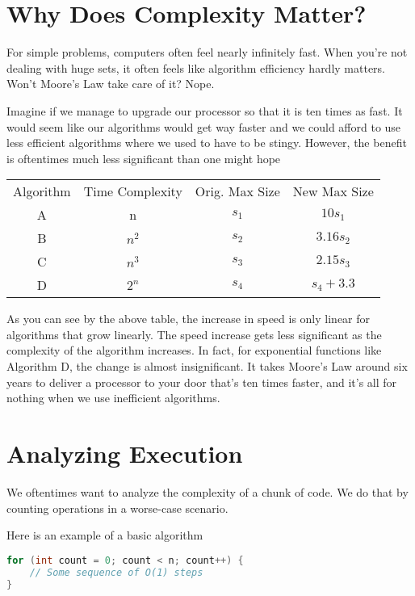 \documentclass{article}
\begin{document}
\section{Why Does Complexity Matter?}
For simple problems, computers often feel nearly infinitely fast. When you're
not dealing with huge sets, it often feels like algorithm efficiency hardly
matters. Won't Moore's Law take care of it? Nope.

Imagine if we manage to upgrade our processor so that it is ten times as fast.
It would seem like our algorithms would get way faster and we could afford to
use less efficient algorithms where we used to have to be stingy. However,
the benefit is oftentimes much less significant than one might hope

\begin{table}[H]
	\centering
	\begin{tabular}{c c c c}
		Algorithm & Time Complexity & Orig. Max Size & New Max Size \\
		A & n     & $s_1$ & $10 s_1$    \\
		B & $n^2$ & $s_2$ & $3.16 s_2$  \\
		C & $n^3$ & $s_3$ & $2.15 s_3$  \\
		D & $2^n$ & $s_4$ & $s_4 + 3.3$ \\
	\end{tabular}
\end{table}

As you can see by the above table, the increase in speed is only linear for
algorithms that grow linearly. The speed increase gets less significant as the
complexity of the algorithm increases. In fact, for exponential functions like
Algorithm D, the change is almost insignificant. It takes Moore's Law around
six years to deliver a processor to your door that's ten times faster, and it's
all for nothing when we use inefficient algorithms.

\section{Analyzing Execution}
We oftentimes want to analyze the complexity of a chunk of code. We do that by
counting operations in a worse-case scenario.

Here is an example of a basic algorithm

\begin{lstlisting}[language=Java]
for (int count = 0; count < n; count++) {
	// Some sequence of O(1) steps
}
\end{lstlisting}
\end{document}
